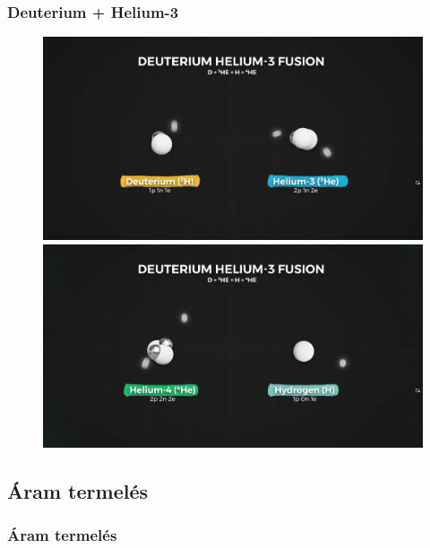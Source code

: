 \documentclass{beamer}
\begin{document}
\begin{frame}
    \frametitle{Deuterium + Helium-3}
    \begin{figure}
        \includegraphics[scale=0.09]{d_h3_fusion.png}
        \includegraphics[scale=0.09]{d_h3_fusion_2.png}
    \end{figure}
\end{frame}

\subsection{Áram termelés}
\begin{frame}
    \frametitle{Áram termelés}
    

\end{frame}
\end{document}
